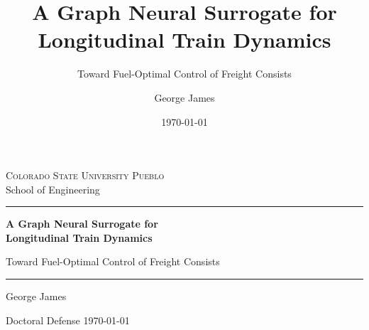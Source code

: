 \documentclass[aspectratio=169,11pt]{beamer}
\title[A Graph Neural Surrogate for Longitudinal Train Dynamics]%
      {A Graph Neural Surrogate for\\Longitudinal Train Dynamics}
\subtitle{Toward Fuel-Optimal Control of Freight Consists}
\author[G. James]{George James}
\institute{School of Engineering\\Colorado State University Pueblo}
\date{\today}
\begin{document}
{%
\begin{frame}[plain]
  \vspace{0.7em}
  \begin{center}
    {\color{uniSlate}\footnotesize\textsc{Colorado State University Pueblo}
     \\[0.15em] \scriptsize School of Engineering}

    \vspace{1.1em}
    \color{uniCrimson}\rule{0.55\textwidth}{2pt}

    \vspace{1.0em}
    {\color{uniNavy}\LARGE\bfseries A Graph Neural Surrogate for\\[0.25em]
     Longitudinal Train Dynamics\par}

    \vspace{0.55em}
    {\color{uniSlate}\normalsize Toward Fuel-Optimal Control of Freight Consists\par}

    \vspace{1.0em}
    \color{uniCrimson}\rule{0.55\textwidth}{2pt}

    \vspace{1.1em}
    {\color{uniInk}\large George James\par}
    \vspace{0.3em}
    {\color{uniSlate}\footnotesize Doctoral Defense \quad\textbullet\quad \today\par}
  \end{center}
\end{frame}
}
\end{document}
